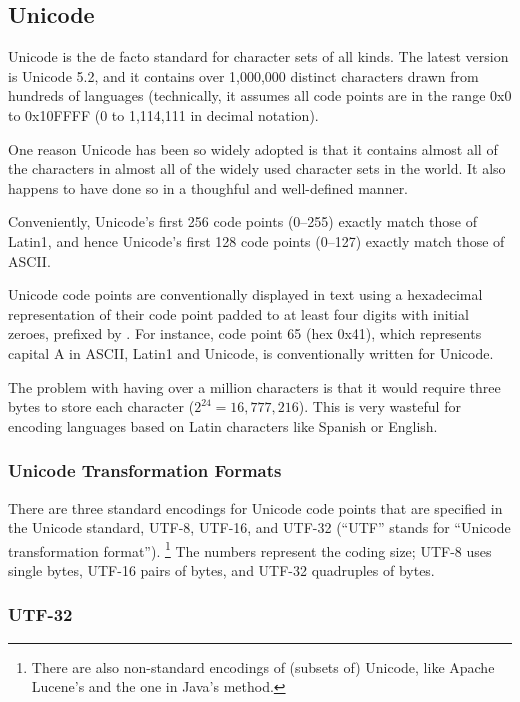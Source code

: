 \subsection{Unicode}

Unicode is the de facto standard for character sets of all kinds.  The
latest version is Unicode 5.2, and it contains over 1,000,000 distinct
characters drawn from hundreds of languages (technically, it assumes
all code points are in the range 0x0 to 0x10FFFF (0 to 1,114,111 in
decimal notation).

One reason Unicode has been so widely adopted is that it contains
almost all of the characters in almost all of the widely used
character sets in the world.  It also happens to have done so in a
thoughful and well-defined manner.

Conveniently, Unicode's first 256 code points (0--255) exactly match
those of Latin1, and hence Unicode's first 128 code points (0--127)
exactly match those of ASCII.

Unicode code points are conventionally displayed in text using a
hexadecimal representation of their code point padded to at least four
digits with initial zeroes, prefixed by .  For instance, code
point 65 (hex 0x41), which represents capital A in ASCII, Latin1 and
Unicode, is conventionally written  for Unicode.

The problem with having over a million characters is that it would
require three bytes to store each character ($2^{24} = 16,777,216$).
This is very wasteful for encoding languages based on Latin characters
like Spanish or English.

\subsubsection{Unicode Transformation Formats}

There are three standard encodings for Unicode code points that are
specified in the Unicode standard, UTF-8, UTF-16, and UTF-32 (``UTF''
stands for ``Unicode transformation format'').%
%
\footnote{There are also non-standard encodings of (subsets of) 
Unicode, like Apache Lucene's and the one in Java's
 method.}
%
The numbers represent the coding size; UTF-8 uses single bytes,
UTF-16 pairs of bytes, and UTF-32 quadruples of bytes.

\subsubsection{UTF-32}

